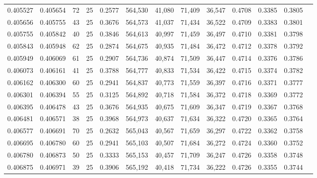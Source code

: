 \begin{tabular}{rrrrrrrrrrrrr}
0.405527 & 0.405654 &    72 &  25 &                                     0.2577 & 564,530 &  41,080 &  71,409 &  36,547 & 0.4708 & 0.3385 & 0.3805 \\
0.405656 & 0.405755 &    43 &  25 &                                     0.3676 & 564,573 &  41,037 &  71,434 &  36,522 & 0.4709 & 0.3383 & 0.3801 \\
0.405755 & 0.405842 &    40 &  25 &                                     0.3846 & 564,613 &  40,997 &  71,459 &  36,497 & 0.4710 & 0.3381 & 0.3798 \\
0.405843 & 0.405948 &    62 &  25 &                                     0.2874 & 564,675 &  40,935 &  71,484 &  36,472 & 0.4712 & 0.3378 & 0.3792 \\
0.405949 & 0.406069 &    61 &  25 &                                     0.2907 & 564,736 &  40,874 &  71,509 &  36,447 & 0.4714 & 0.3376 & 0.3786 \\
0.406073 & 0.406161 &    41 &  25 &                                     0.3788 & 564,777 &  40,833 &  71,534 &  36,422 & 0.4715 & 0.3374 & 0.3782 \\
0.406162 & 0.406300 &    60 &  25 &                                     0.2941 & 564,837 &  40,773 &  71,559 &  36,397 & 0.4716 & 0.3371 & 0.3777 \\
0.406301 & 0.406394 &    55 &  25 &                                     0.3125 & 564,892 &  40,718 &  71,584 &  36,372 & 0.4718 & 0.3369 & 0.3772 \\
0.406395 & 0.406478 &    43 &  25 &                                     0.3676 & 564,935 &  40,675 &  71,609 &  36,347 & 0.4719 & 0.3367 & 0.3768 \\
0.406481 & 0.406571 &    38 &  25 &                                     0.3968 & 564,973 &  40,637 &  71,634 &  36,322 & 0.4720 & 0.3365 & 0.3764 \\
0.406577 & 0.406691 &    70 &  25 &                                     0.2632 & 565,043 &  40,567 &  71,659 &  36,297 & 0.4722 & 0.3362 & 0.3758 \\
0.406695 & 0.406780 &    60 &  25 &                                     0.2941 & 565,103 &  40,507 &  71,684 &  36,272 & 0.4724 & 0.3360 & 0.3752 \\
0.406780 & 0.406873 &    50 &  25 &                                     0.3333 & 565,153 &  40,457 &  71,709 &  36,247 & 0.4726 & 0.3358 & 0.3748 \\
0.406875 & 0.406971 &    39 &  25 &                                     0.3906 & 565,192 &  40,418 &  71,734 &  36,222 & 0.4726 & 0.3355 & 0.3744 \\

\end{tabular}

